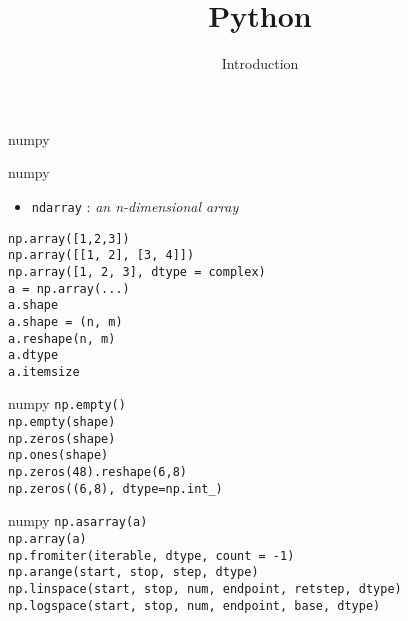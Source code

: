 
\title{Python}
\subtitle{Introduction}




\begin{frame}
  \titlepage
\end{frame}

\begin{frame}{numpy}
\end{frame}

\begin{frame}{numpy}
  \begin{itemize}
  \item \texttt{ndarray} : \textit{an n-dimensional array}
  \end{itemize}

  \texttt{np.array([1,2,3])}\\
  \texttt{np.array([[1, 2], [3, 4]])}\\
  \texttt{np.array([1, 2, 3], dtype = complex)}\\[5mm]

  \texttt{a = np.array(...)}\\
  \texttt{a.shape}\\
  \texttt{a.shape = (n, m)}\\
  \texttt{a.reshape(n, m)}\\[5mm]

  \texttt{a.dtype}\\
  \texttt{a.itemsize}
\end{frame}

\begin{frame}{numpy}
  \texttt{np.empty()}\\
  \texttt{np.empty(shape)}\\[5mm]

  \texttt{np.zeros(shape)}\\
  \texttt{np.ones(shape)}\\[5mm]

  \texttt{np.zeros(48).reshape(6,8)}\\
  \texttt{np.zeros((6,8), dtype=np.int\_)}  
\end{frame}

\begin{frame}{numpy}
  \texttt{np.asarray(a)}\\
  \texttt{np.array(a)}\\
  \texttt{np.fromiter(iterable, dtype, count = -1)}\\[7mm]

  \texttt{np.arange(start, stop, step, dtype)}\\[3mm]
  \texttt{np.linspace(start, stop, num, endpoint, retstep, dtype)}\\[3mm]
  \texttt{np.logspace(start, stop, num, endpoint, base, dtype)}
\end{frame}

